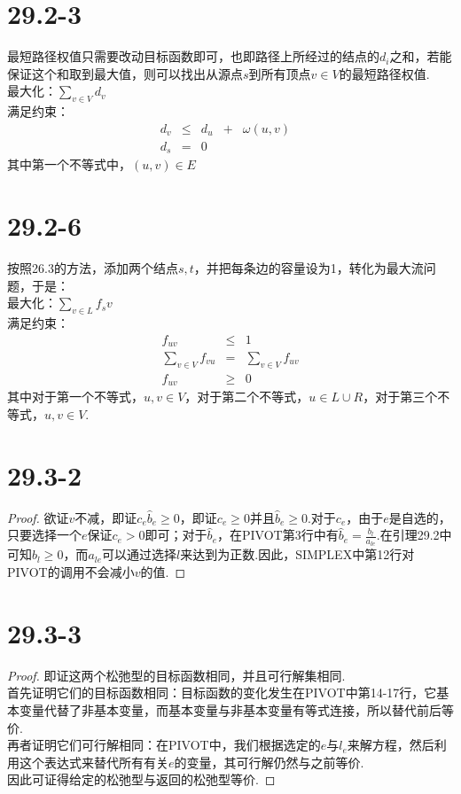 \documentclass[twocolumn]{article}
\newenvironment{SChinese}{%
	\CJKfamily{gbsn}%
	\CJKtilde
	\CJKnospace}{}
\begin{document}
\begin{CJK}{UTF8}{}
\begin{SChinese}
			\section*{29.2-3}
				最短路径权值只需要改动目标函数即可，也即路径上所经过的结点的$d_i$之和，若能保证这个和取到最大值，则可以找出从源点$s$到所有顶点$v\in V$的最短路径权值.\\
				最大化：$\sum_{v\in V}^{}d_v$\\
				满足约束：\begin{displaymath}
				\begin{matrix}
				d_v & \le & d_u & + & \omega(u,v) & \\
				d_s & = & 0 &  & 
				\end{matrix}
				\end{displaymath}
				其中第一个不等式中，$(u,v)\in E$
			\section*{29.2-6}
				按照26.3的方法，添加两个结点$s,t$，并把每条边的容量设为1，转化为最大流问题，于是：\\
				最大化：$\sum_{v\in L}^{}f_sv$\\
				满足约束：\begin{displaymath}
				\begin{matrix}
				f_{uv} & \le & 1 \\
				\sum_{v\in V}^{}f_{vu} & = & \sum_{v\in V}^{}f_{uv} \\
				f_{uv} & \ge & 0
				\end{matrix}
				\end{displaymath}
				其中对于第一个不等式，$u,v\in V$，对于第二个不等式，$u\in L \cup R$，对于第三个不等式，$u,v\in V$.
			\section*{29.3-2}
				\begin{proof}
					欲证$v$不减，即证$c_e\hat{b}_e\ge0$，即证$c_e\ge0$并且$\hat{b}_e\ge0$.对于$c_e$，由于$e$是自选的，只要选择一个$e$保证$c_e>0$即可；对于$\hat{b}_e$，在PIVOT第3行中有$\hat{b}_e=\frac{b_l}{a_{le}}$.在引理29.2中可知$b_l\ge0$，而$a_{le}$可以通过选择$l$来达到为正数.因此，SIMPLEX中第12行对PIVOT的调用不会减小$v$的值.
				\end{proof}
			\section*{29.3-3}
				\begin{proof}
					即证这两个松弛型的目标函数相同，并且可行解集相同.\\
					首先证明它们的目标函数相同：目标函数的变化发生在PIVOT中第14-17行，它基本变量代替了非基本变量，而基本变量与非基本变量有等式连接，所以替代前后等价.\\
					再者证明它们可行解相同：在PIVOT中，我们根据选定的$e$与$l_e$来解方程，然后利用这个表达式来替代所有有关$e$的变量，其可行解仍然与之前等价.\\
					因此可证得给定的松弛型与返回的松弛型等价.
				\end{proof}

\end{SChinese}
\end{CJK}
\end{document}
